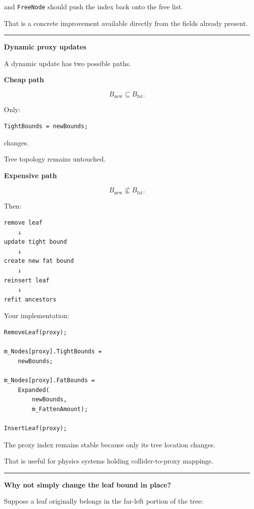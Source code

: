 and \texttt{FreeNode} should push the index back onto the free list.

That is a concrete improvement available directly from the fields already present.

\begin{center}\rule{0.5\linewidth}{0.5pt}\end{center}

\textbf{Dynamic proxy updates}

A dynamic update has two possible paths.

\textbf{Cheap path}

\[
B_{\text{new}}\subseteq B_{\text{fat}}.
\]

Only:

\begin{verbatim}
TightBounds = newBounds;
\end{verbatim}

changes.

Tree topology remains untouched.

\textbf{Expensive path}

\[
B_{\text{new}}\not\subseteq B_{\text{fat}}.
\]

Then:

\begin{verbatim}
remove leaf
    ↓
update tight bound
    ↓
create new fat bound
    ↓
reinsert leaf
    ↓
refit ancestors
\end{verbatim}

Your implementation:

\begin{verbatim}
RemoveLeaf(proxy);

m_Nodes[proxy].TightBounds =
    newBounds;

m_Nodes[proxy].FatBounds =
    Expanded(
        newBounds,
        m_FattenAmount);

InsertLeaf(proxy);
\end{verbatim}

The proxy index remains stable because only its tree location changes.

That is useful for physics systems holding collider-to-proxy mappings.

\begin{center}\rule{0.5\linewidth}{0.5pt}\end{center}

\textbf{Why not simply change the leaf bound in place?}

Suppose a leaf originally belongs in the far-left portion of the tree:

